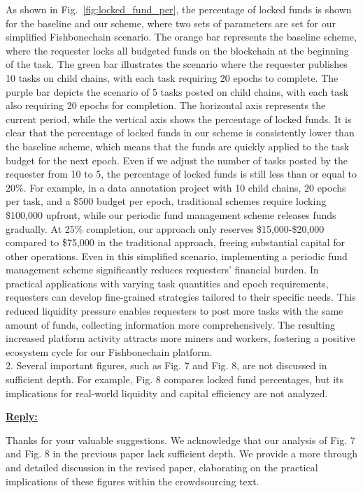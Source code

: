 {{As shown in Fig.~\ref{fig:locked_fund_per}, the percentage of locked funds is shown for the baseline and our scheme, where two sets of parameters are set for our simplified Fishbonechain scenario. The orange bar represents the baseline scheme, where the requester locks all budgeted funds on the blockchain at the beginning of the task. The green bar illustrates the scenario where the requester publishes 10 tasks on child chains, with each task requiring 20 epochs to complete. The purple bar depicts the scenario of 5 tasks posted on child chains, with each task also requiring 20 epochs for completion. The horizontal axis represents the current period, while the vertical axis shows the percentage of locked funds. It is clear that the percentage of locked funds in our scheme is consistently lower than the baseline scheme, which means that the funds are quickly applied to the task budget for the next epoch. Even if we adjust the number of tasks posted by the requester from 10 to 5, the percentage of locked funds is still less than or equal to $20 \%$. For example, in a data annotation project with 10 child chains, 20 epochs per task, and a \$500 budget per epoch, traditional schemes require locking \$100,000 upfront, while our periodic fund management scheme releases funds gradually. At 25\% completion, our approach only reserves \$15,000-\$20,000 compared to \$75,000 in the traditional approach, freeing substantial capital for other operations. Even in this simplified scenario, implementing a periodic fund management scheme significantly reduces requesters' financial burden. In practical applications with varying task quantities and epoch requirements, requesters can develop fine-grained strategies tailored to their specific needs. This reduced liquidity pressure enables requesters to post more tasks with the same amount of funds, collecting information more comprehensively. The resulting increased platform activity attracts more miners and workers, fostering a positive ecosystem cycle for our Fishbonechain platform.
}\\ %


2. Several important figures, such as Fig. 7 and Fig. 8, are not discussed in sufficient depth. For example, Fig. 8 compares locked fund percentages, but its implications for real-world liquidity and capital efficiency are not analyzed.

{\color{blue}
\noindent \underline{\textbf{Reply:}}

Thanks for your valuable suggestions. We acknowledge that our analysis of Fig. 7 and Fig. 8 in the previous paper lack sufficient depth. We provide a more through and detailed discussion in the revised paper, elaborating on the practical implications of these figures within the crowdsourcing text.

}}
